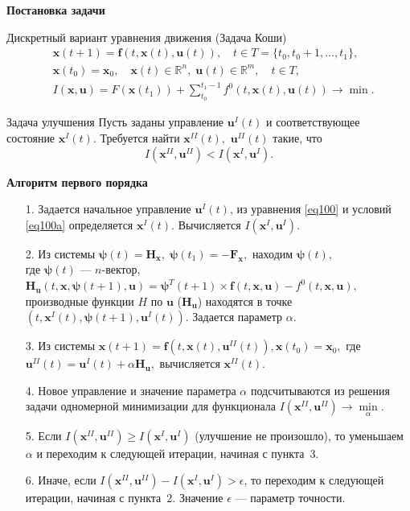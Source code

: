 \documentclass[10pt]{beamer}
\begin{document}
\begin{frame}{\textbf{Постановка задачи} }
\begin{block}{Дискретный вариант уравнения движения (Задача Коши)}
  \begin{align}
&\mathbf{x}(t+1)=\mathbf{f}(t,\mathbf{x}(t),\mathbf{u}(t)),\quad t \in T=\{t_0,t_0+1,...,t_1\},
	\label{eq100} \\
&\mathbf{x}(t_0)=\mathbf{x}_0,\quad \mathbf{x}(t)\in \mathbb{R}^n,\; \mathbf{u}(t) \in \mathbb{R}^m,\quad t\in T,\label{eq100a} \\
&I(\mathbf{x},\mathbf{u})=F(\mathbf{x}(t_1))+ \sum_{t_0}^{t_1-1}f^0(t,\mathbf{x}(t),\mathbf{u}(t)) \to \min.
  \label{eq103}
  \end{align}
\end{block}
\begin{block}{Задача улучшения}
  Пусть заданы управление $\mathbf{u}^I(t)$ и соответствующее состояние $\mathbf{x}^I(t)$. Требуется найти $\mathbf{x}^{I\!I}(t),$ $\mathbf{u}^{I\!I}(t)$ такие, что
\[
I(\mathbf{x}^{I\!I},\mathbf{u}^{I\!I}) < I(\mathbf{x}^I,\mathbf{u}^I).
\]
 \end{block}
\end{frame}
\def\H{\mathbf{H}}
\def\x{\mathbf{x}}
\def\u{\mathbf{u}}
\def\f{\mathbf{f}}
\def\F{\mathbf{F}}
\def\bpsi{\mathbf{\psi}}
\begin{frame}[shrink]{\textbf{Алгоритм первого порядка} }
\begin{enumerate}
 \item[1.] Задается начальное управление $\mathbf{u}^I(t)$, из уравнения \eqref{eq100} и условий \eqref{eq100a} определяется $\mathbf{x}^I(t)$. Вычисляется $I(\mathbf{x}^I,\mathbf{u}^I).$
 \item[2.] Из системы $\mathbf{\psi}(t)=\mathbf{H}_\mathbf{x},\;\bpsi(t_1)=-\F_\x,$ находим $\bpsi(t),$\\ где $\bpsi(t)$ --- $n$-вектор, $\H_\u(t,\x,\bpsi(t+1),\u)=\bpsi^{T}(t+1)\times\f(t,\x,\u)-f^{0}(t,\x,\u),$ производные функции $H$ по $\u$ ($\H_\u$) находятся в точке $\left(t,\x^{I}(t),\bpsi \left(t+1 \right),\u^{I}(t)\right)$. Задается параметр $\alpha$.
 \item[3.] Из системы $\x(t+1)=\f(t,\x(t),\u^{I\!I}(t)), \x(t_0)=\x_0,$ где $\u^{I\!I}(t)=\u^{I}(t)+\alpha \H_\u,$ вычисляется $\x^{I\!I}(t).$
 \item[4.] Новое управление и значение параметра $\alpha$ подсчитываются из решения задачи одномерной минимизации для функционала $I(\x^{I\!I},\u^{I\!I})\to \min\limits_{\alpha}.$
 \item[5.] Если $I\left(\x^{I\!I},\u^{I\!I}\right)\geq I\left(\x^{I},\u^{I}\right)$ (улучшение не произошло), то уменьшаем $\alpha$ и переходим к следующей итерации, начиная с пункта~3.
 \item[6.] Иначе, если $I\left(\x^{I\!I},\u^{I\!I}\right) - I\left(\x^{I},\u^{I}\right)>\epsilon$, то переходим к следующей итерации, начиная с пункта~2. Значение $\epsilon$ --- параметр точности.
\end{enumerate}
\end{frame}
\end{document}
